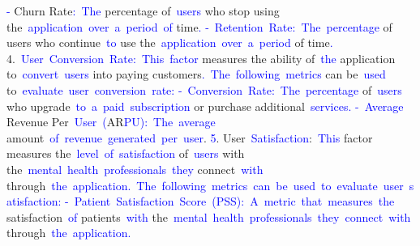 \begin{tcolorbox}[colframe=gray!70!black,colback=white, title=Sample 6]
{}\textcolor{blue}{-} Churn Rate\textcolor{blue}{:}\textcolor{blue}{~The} percentage of\textcolor{blue}{~users} who stop using the\textcolor{blue}{~application}\textcolor{blue}{~over}\textcolor{blue}{~a}\textcolor{blue}{~period}\textcolor{blue}{~of} time\textcolor{blue}{.
}\textcolor{blue}{-}\textcolor{blue}{~Ret}\textcolor{blue}{ention}\textcolor{blue}{~Rate}\textcolor{blue}{:}\textcolor{blue}{~The}\textcolor{blue}{~percentage} of users who continue\textcolor{blue}{~to} use the\textcolor{blue}{~application}\textcolor{blue}{~over}\textcolor{blue}{~a}\textcolor{blue}{~period} of time\textcolor{blue}{.
}4.\textcolor{blue}{~User}\textcolor{blue}{~Conversion}\textcolor{blue}{~Rate}\textcolor{blue}{:}\textcolor{blue}{~This}\textcolor{blue}{~factor} measures the ability of\textcolor{blue}{~the} application to\textcolor{blue}{~convert}\textcolor{blue}{~users} into paying customers\textcolor{blue}{.}\textcolor{blue}{~The}\textcolor{blue}{~following}\textcolor{blue}{~metrics} can be\textcolor{blue}{~used} to\textcolor{blue}{~evaluate}\textcolor{blue}{~user}\textcolor{blue}{~conversion}\textcolor{blue}{~rate}\textcolor{blue}{:
}\textcolor{blue}{-}\textcolor{blue}{~Conversion}\textcolor{blue}{~Rate}\textcolor{blue}{:}\textcolor{blue}{~The}\textcolor{blue}{~percentage} of\textcolor{blue}{~users} who upgrade\textcolor{blue}{~to}\textcolor{blue}{~a}\textcolor{blue}{~paid}\textcolor{blue}{~subscription} or purchase additional\textcolor{blue}{~services}\textcolor{blue}{.
}\textcolor{blue}{-}\textcolor{blue}{~Average} Revenue Per\textcolor{blue}{~User}\textcolor{blue}{~(}AR\textcolor{blue}{PU}\textcolor{blue}{):}\textcolor{blue}{~The}\textcolor{blue}{~average} amount\textcolor{blue}{~of}\textcolor{blue}{~revenue}\textcolor{blue}{~generated}\textcolor{blue}{~per}\textcolor{blue}{~user}.
\textcolor{blue}{5}. User\textcolor{blue}{~Satisfaction}:\textcolor{blue}{~This} factor measures the\textcolor{blue}{~level}\textcolor{blue}{~of}\textcolor{blue}{~satisfaction} of\textcolor{blue}{~users} with the\textcolor{blue}{~mental}\textcolor{blue}{~health}\textcolor{blue}{~professionals}\textcolor{blue}{~they} connect\textcolor{blue}{~with} through\textcolor{blue}{~the}\textcolor{blue}{~application}\textcolor{blue}{.}\textcolor{blue}{~The}\textcolor{blue}{~following}\textcolor{blue}{~metrics}\textcolor{blue}{~can}\textcolor{blue}{~be}\textcolor{blue}{~used}\textcolor{blue}{~to}\textcolor{blue}{~evaluate}\textcolor{blue}{~user}\textcolor{blue}{~satisfaction}\textcolor{blue}{:
}\textcolor{blue}{-}\textcolor{blue}{~Patient}\textcolor{blue}{~Satisfaction}\textcolor{blue}{~Score}\textcolor{blue}{~(}\textcolor{blue}{P}\textcolor{blue}{SS}\textcolor{blue}{):}\textcolor{blue}{~A}\textcolor{blue}{~metric}\textcolor{blue}{~that}\textcolor{blue}{~measures}\textcolor{blue}{~the} satisfaction\textcolor{blue}{~of} patients\textcolor{blue}{~with} the\textcolor{blue}{~mental}\textcolor{blue}{~health}\textcolor{blue}{~professionals}\textcolor{blue}{~they}\textcolor{blue}{~connect}\textcolor{blue}{~with} through\textcolor{blue}{~the}\textcolor{blue}{~application}\textcolor{blue}{.
}
\end{tcolorbox}
